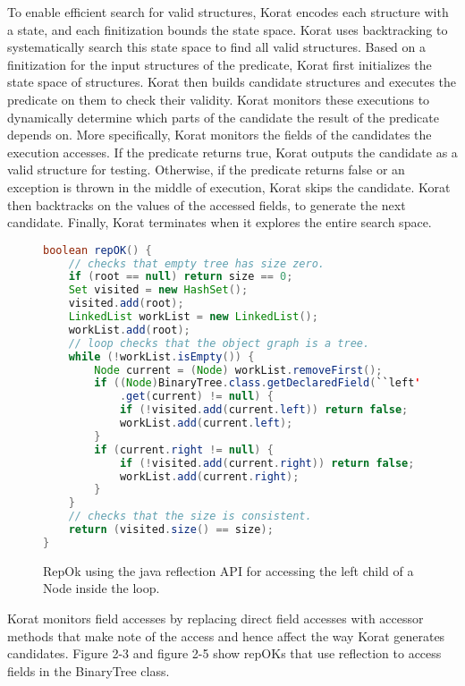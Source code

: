 \par
To enable efficient search for valid structures, Korat encodes each structure with a state, and each finitization bounds the state space. Korat uses backtracking to systematically search this state space to find all valid structures. Based on a finitization for the input structures of the predicate, Korat first initializes the state space of structures. Korat then builds candidate structures and executes the predicate on them to check their validity. Korat monitors these executions to dynamically determine which parts of the candidate the result of the predicate depends on. More specifically, Korat monitors the fields of the candidates the execution accesses. If the predicate returns true, Korat outputs the candidate as a valid structure for testing. Otherwise, if the predicate returns false or an exception is thrown in the middle of execution, Korat skips the candidate. Korat then backtracks on the values of the accessed fields, to generate the next candidate. Finally, Korat terminates when it explores the entire search space. 

\begin{figure}
\centering
\begin{lstlisting}[language=Java]
boolean repOK() {
    // checks that empty tree has size zero.
    if (root == null) return size == 0;
    Set visited = new HashSet();
    visited.add(root);
    LinkedList workList = new LinkedList();
    workList.add(root);
    // loop checks that the object graph is a tree.
    while (!workList.isEmpty()) {
        Node current = (Node) workList.removeFirst();
        if ((Node)BinaryTree.class.getDeclaredField(``left'')
            .get(current) != null) {
            if (!visited.add(current.left)) return false;
            workList.add(current.left);
        }
        if (current.right != null) {
            if (!visited.add(current.right)) return false;
            workList.add(current.right);
        }
    }
    // checks that the size is consistent.
    return (visited.size() == size);
}
\end{lstlisting}
\caption{RepOk using the java reflection API for accessing the left child of a Node inside the loop.}
\label{fig:btTreeReflectionRepOK}
\end{figure}

\par
Korat monitors field accesses by replacing direct field accesses with accessor methods that make note of the access and hence affect the way Korat generates candidates. Figure 2-3 and figure 2-5 show repOKs that use reflection to access fields in the BinaryTree class.

